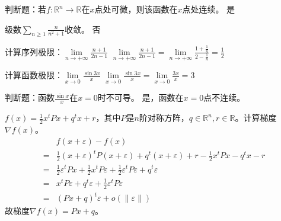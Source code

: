 

\newcommand\Title{2020智能计算数学基础试卷}
\renewcommand\due{due: November 6, 2022}

\newcommand{\tr}{\operatorname{tr}}
\newcommand{\todo}{{\color{red} to do}} %




\begin{problem}
	判断题：若$f:\mathbb{R}^n\to\mathbb{R}$在$x$点处可微，则该函数在$x$点处连续。
	\solution 是
\end{problem}

\begin{problem}
	级数$\sum_{n\ge 1}\frac{n}{n^2+1}$收敛。
	\solution 否
\end{problem}

\begin{problem}
	计算序列极限：$\underset{n\to +\infty}{\lim}\frac{n+1}{2n-1}$
	\solution $\underset{n\to +\infty}{\lim}\frac{n+1}{2n-1} = \underset{n\to +\infty}{\lim}\frac{1+\frac{1}{n}}{2-\frac{1}{n}} = \frac{1}{2}$
\end{problem}

\begin{problem}
	计算函数极限：$\underset{x\to 0}{\lim}\frac{\sin 3x}{x}$
	\solution $\underset{x\to 0}{\lim}\frac{\sin 3x}{x} = \underset{x\to 0}{\lim}\frac{3x}{x} = 3$
\end{problem}

\begin{problem}
	判断题：函数$\frac{\sin x}{x}$在$x=0$时不可导。
	\solution 是，函数在$x=0$点不连续。
\end{problem}

\begin{problem}
	$f(x)=\frac{1}{2}x^tPx+q^tx+r$，其中$P$是$n$阶对称方阵，$q\in\mathbb{R}^{n},r\in\mathbb{R}$。计算梯度$\nabla f(x)$。
	\solution \begin{align*}
		&f(x+\varepsilon)-f(x)\\
		=&\frac{1}{2}(x+\varepsilon)^tP(x+\varepsilon)+q^t(x+\varepsilon)+r-\frac{1}{2}x^tPx-q^tx-r\\
		=&\frac{1}{2}\varepsilon^tPx+\frac{1}{2}x^tP\varepsilon+\frac{1}{2}\varepsilon^tP\varepsilon +q^t\varepsilon\\
		=&x^tP\varepsilon+q^t\varepsilon +\frac{1}{2}\varepsilon ^tP\varepsilon \\
		=&(Px+q)^t\varepsilon +o(\|\varepsilon \|)  
	\end{align*}
	故梯度$\nabla f(x)=Px+q$。
\end{problem}

